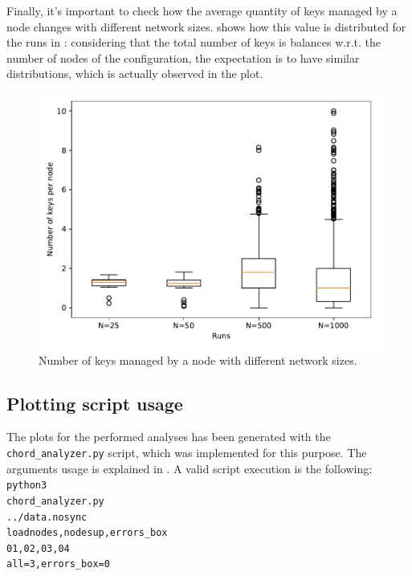 \documentclass[11pt,twocolumn,letterpaper]{article}
\begin{document}
	Finally, it's important to check how the average quantity of keys managed by a node changes with different network sizes.  shows how this value is distributed for the runs in : considering that the total number of keys is balances w.r.t. the number of nodes of the configuration, the expectation is to have similar distributions, which is actually observed in the plot.
	
	\begin{figure}[!t]
		\centering
		\includegraphics[width=\linewidth,clip,trim=0 0.5cm 0 0.35cm]{figures/analysis3/keyspernode.pdf}
		\caption{Number of keys managed by a node with different network sizes.}
		\label{fig:keys4}
	\end{figure}	

	\subsection{Plotting script usage}
		The plots for the performed analyses has been generated with the \texttt{chord\_analyzer.py} script, which was implemented for this purpose. The arguments usage is explained in . A valid script execution is the following: \\
		\texttt{\hspace*{1cm}python3\textvisiblespace \\\hspace*{1cm}chord\_analyzer.py\textvisiblespace \\\hspace*{1cm}../data.nosync\textvisiblespace \\\hspace*{1cm}loadnodes,nodesup,errors\_box\textvisiblespace \\\hspace*{1cm}01,02,03,04\textvisiblespace \\\hspace*{1cm}all=3,errors\_box=0}
		
\end{document}
